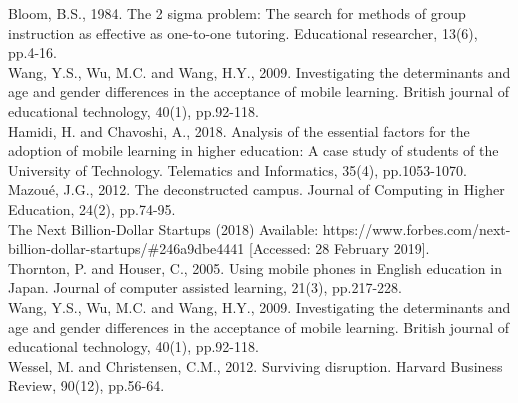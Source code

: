\documentclass[11]{article}
\begin{document}
Bloom, B.S., 1984. The 2 sigma problem: The search for methods of group instruction as effective as one-to-one tutoring. Educational researcher, 13(6), pp.4-16. \\

Wang, Y.S., Wu, M.C. and Wang, H.Y., 2009. Investigating the determinants and age and gender differences in the acceptance of mobile learning. British journal of educational technology, 40(1), pp.92-118.\\

Hamidi, H. and Chavoshi, A., 2018. Analysis of the essential factors for the adoption of mobile learning in higher education: A case study of students of the University of Technology. Telematics and Informatics, 35(4), pp.1053-1070.\\

Mazoué, J.G., 2012. The deconstructed campus. Journal of Computing in Higher Education, 24(2), pp.74-95.\\

The Next Billion-Dollar Startups (2018) Available: https://www.forbes.com/next-billion-dollar-startups/\#246a9dbe4441 [Accessed: 28 February 2019].\\

Thornton, P. and Houser, C., 2005. Using mobile phones in English education in Japan. Journal of computer assisted learning, 21(3), pp.217-228.\\

Wang, Y.S., Wu, M.C. and Wang, H.Y., 2009. Investigating the determinants and age and gender differences in the acceptance of mobile learning. British journal of educational technology, 40(1), pp.92-118.\\

Wessel, M. and Christensen, C.M., 2012. Surviving disruption. Harvard Business Review, 90(12), pp.56-64.\\
\end{document}
